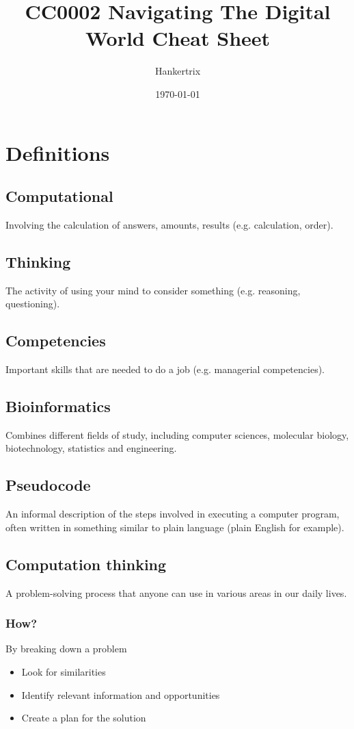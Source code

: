 \documentclass[11pt]{article}
\author{Hankertrix}
\date{\today}
\title{CC0002 Navigating The Digital World Cheat Sheet}
\begin{document}
\maketitle
\setcounter{tocdepth}{2}
\tableofcontents \clearpage
\section{Definitions}
\label{sec:orgd95a4fd}

\subsection{Computational}
\label{sec:orgaa5a933}
Involving the calculation of answers, amounts, results (e.g. calculation, order).

\subsection{Thinking}
\label{sec:orgd34b4a0}
The activity of using your mind to consider something (e.g. reasoning, questioning).

\subsection{Competencies}
\label{sec:org8de66d7}
Important skills that are needed to do a job (e.g. managerial competencies).

\subsection{Bioinformatics}
\label{sec:org3a962a8}
Combines different fields of study, including computer sciences, molecular biology, biotechnology, statistics and engineering.

\subsection{Pseudocode}
\label{sec:org23189dc}
An informal description of the steps involved in executing a computer program, often written in something similar to plain language (plain English for example).

\subsection{Computation thinking}
\label{sec:orgbabef7b}
A problem-solving process that anyone can use in various areas in our daily lives.

\subsubsection{How?}
\label{sec:org0f9acf8}
By breaking down a problem
\begin{itemize}
\item Look for similarities
\item Identify relevant information and opportunities
\item Create a plan for the solution
\end{itemize}
\end{document}
